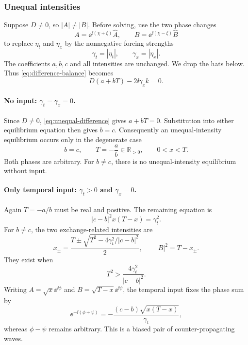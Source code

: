 \subsubsection{Unequal intensities}

Suppose $D\neq0$, so $|A|\neq|B|$.  Before solving, use the two phase
changes
\[
 A=\ee^{\ii(\chi+\xi)}\widehat A,
 \qquad B=\ee^{\ii(\chi-\xi)}\widehat B
\]
to replace $\eta_t$ and $\eta_x$ by the nonnegative forcing strengths
\begin{equation}
 \gamma_t=|\eta_t|,
 \qquad \gamma_x=|\eta_x|.
 \label{eq:forcing-strengths}
\end{equation}
The coefficients $a,b,c$ and all intensities are unchanged.  We drop the
hats below.  Thus \eqref{eq:difference-balance} becomes
\begin{equation}
 D(a+bT)-2\ii\gamma_x k=0.
 \label{eq:unequal-difference}
\end{equation}

\paragraph{No input: $\gamma_t=\gamma_x=0$.}
Since $D\neq0$, \eqref{eq:unequal-difference} gives $a+bT=0$.
Substitution into either equilibrium equation then gives $b=c$.
Consequently an unequal-intensity equilibrium occurs only in the degenerate
case
\begin{equation}
 b=c,
 \qquad T=-\frac ab\in\mathbb R_{>0},
 \qquad 0<x<T.
 \label{eq:unforced-unequal}
\end{equation}
Both phases are arbitrary.  For $b\neq c$, there is no unequal-intensity
equilibrium without input.

\paragraph{Only temporal input: $\gamma_t>0$ and $\gamma_x=0$.}
Again $T=-a/b$ must be real and positive.  The remaining equation is
\begin{equation}
 |c-b|^2x(T-x)=\gamma_t^2.
 \label{eq:temporal-unequal-balance}
\end{equation}
For $b\neq c$, the two exchange-related intensities are
\begin{equation}
 x_\pm=
 \frac{T\pm\sqrt{T^2-4\gamma_t^2/|c-b|^2}}{2},
 \qquad |B|^2=T-x_\pm.
 \label{eq:temporal-unequal-strength}
\end{equation}
They exist when
\begin{equation}
 T^2>\frac{4\gamma_t^2}{|c-b|^2}.
 \label{eq:temporal-unequal-existence}
\end{equation}
Writing $A=\sqrt{x}\ee^{\ii\phi}$ and
$B=\sqrt{T-x}\ee^{\ii\psi}$, the temporal input fixes the phase sum by
\begin{equation}
 \ee^{-\ii(\phi+\psi)}
 =-\frac{(c-b)\sqrt{x(T-x)}}{\gamma_t},
 \label{eq:temporal-unequal-phase}
\end{equation}
whereas $\phi-\psi$ remains arbitrary.  This is a biased pair of
counter-propagating waves.

